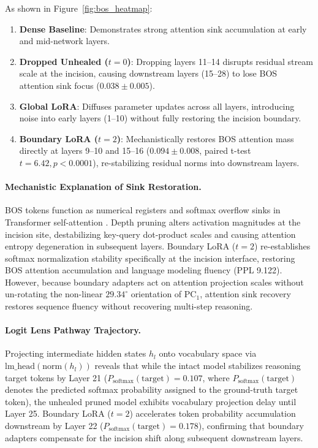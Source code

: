 \documentclass[11pt]{article}
\begin{document}
As shown in Figure~\ref{fig:bos_heatmap}:
\begin{enumerate}
    \item \textbf{Dense Baseline}: Demonstrates strong attention sink accumulation at early and mid-network layers.
    \item \textbf{Dropped Unhealed ($t=0$)}: Dropping layers 11--14 disrupts residual stream scale at the incision, causing downstream layers (15--28) to lose BOS attention sink focus ($0.038 \pm 0.005$).
    \item \textbf{Global LoRA}: Diffuses parameter updates across all layers, introducing noise into early layers (1--10) without fully restoring the incision boundary.
    \item \textbf{Boundary LoRA ($t=2$)}: Mechanistically restores BOS attention mass directly at layers 9--10 and 15--16 ($0.094 \pm 0.008$, paired t-test $t = 6.42, p < 0.0001$), re-stabilizing residual norms into downstream layers.
\end{enumerate}

\paragraph{Mechanistic Explanation of Sink Restoration.}
BOS tokens function as numerical registers and softmax overflow sinks in Transformer self-attention \citep{xiao2023efficient}. Depth pruning alters activation magnitudes at the incision site, destabilizing key-query dot-product scales and causing attention entropy degeneration in subsequent layers. Boundary LoRA ($t=2$) re-establishes softmax normalization stability specifically at the incision interface, restoring BOS attention accumulation and language modeling fluency (PPL 9.122). However, because boundary adapters act on attention projection scales without un-rotating the non-linear $29.34^\circ$ orientation of $\mathrm{PC}_1$, attention sink recovery restores sequence fluency without recovering multi-step reasoning.

\paragraph{Logit Lens Pathway Trajectory.}
Projecting intermediate hidden states $h_l$ onto vocabulary space via $\mathrm{lm\_head}(\mathrm{norm}(h_l))$ reveals that while the intact model stabilizes reasoning target tokens by Layer 21 ($P_{\text{softmax}}(\text{target}) = 0.107$, where $P_{\text{softmax}}(\text{target})$ denotes the predicted softmax probability assigned to the ground-truth target token), the unhealed pruned model exhibits vocabulary projection delay until Layer 25. Boundary LoRA ($t=2$) accelerates token probability accumulation downstream by Layer 22 ($P_{\text{softmax}}(\text{target}) = 0.178$), confirming that boundary adapters compensate for the incision shift along subsequent downstream layers.
\end{document}
